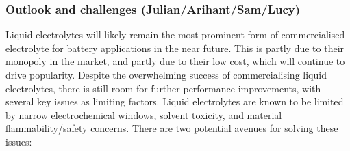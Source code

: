 \documentclass[../main.tex]{subfiles}
\begin{document}
\subsubsection{Outlook and challenges (Julian/Arihant/Sam/Lucy)}
Liquid electrolytes will likely remain the most prominent form of commercialised electrolyte for battery applications in the near future. This is partly due to their monopoly in the market, and partly due to their low cost, which will continue to drive popularity. Despite the overwhelming success of commercialising liquid electrolytes, there is still room for further performance improvements, with several key issues as limiting factors. Liquid electrolytes are known to be limited by narrow electrochemical windows, solvent toxicity, and material flammability/safety concerns. There are two potential avenues for solving these issues:
\end{document}
